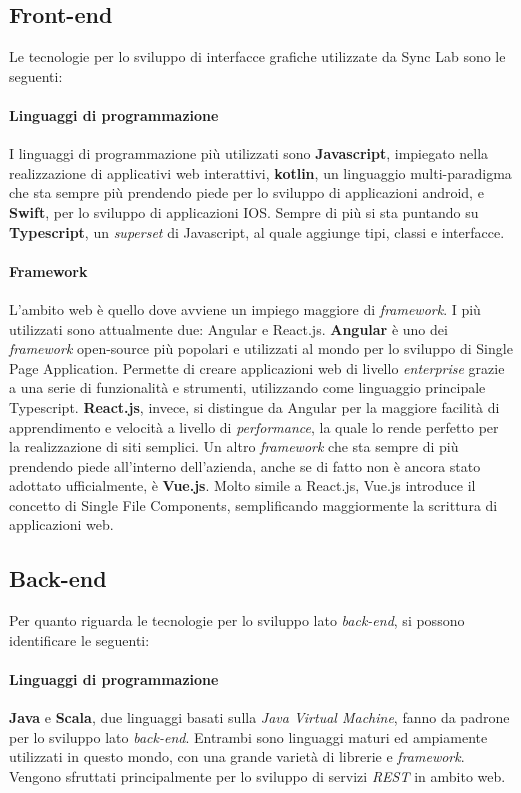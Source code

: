 \subsection{Front-end}
Le tecnologie per lo sviluppo di interfacce grafiche utilizzate da Sync Lab sono le seguenti:

\paragraph{Linguaggi di programmazione} 
I linguaggi di programmazione più utilizzati sono \textbf{Javascript}, impiegato nella realizzazione di applicativi web interattivi, \textbf{kotlin}, un linguaggio multi-paradigma che sta sempre più prendendo piede per lo sviluppo di applicazioni android, e \textbf{Swift}, per lo sviluppo di applicazioni IOS. Sempre di più si sta puntando su \textbf{Typescript}, un \textit{superset} di Javascript, al quale aggiunge tipi, classi e interfacce.

\paragraph{Framework}
L'ambito web è quello dove avviene un impiego maggiore di \textit{framework}. I più utilizzati sono attualmente due: Angular e React.js. \textbf{Angular} è uno dei \textit{framework} open-source più popolari e utilizzati al mondo per lo sviluppo di \gls{Single Page Application}. Permette di creare applicazioni web di livello \textit{enterprise} grazie a una serie di funzionalità e strumenti, utilizzando come linguaggio principale Typescript. \textbf{React.js}, invece, si distingue da Angular per la maggiore facilità di apprendimento e velocità a livello di \textit{performance}, la quale lo rende perfetto per la realizzazione di siti semplici. Un altro \textit{framework} che sta sempre di più prendendo piede all'interno dell'azienda, anche se di fatto non è ancora stato adottato ufficialmente, è \textbf{Vue.js}. Molto simile a React.js, Vue.js introduce il concetto di \gls{Single File Components}, semplificando maggiormente la scrittura di applicazioni web.

\subsection{Back-end}
Per quanto riguarda le tecnologie per lo sviluppo lato \textit{back-end}, si possono identificare le seguenti:

\paragraph{Linguaggi di programmazione}
\textbf{Java} e \textbf{Scala}, due linguaggi basati sulla \textit{Java Virtual Machine}, fanno da padrone per lo sviluppo lato \textit{back-end}. Entrambi sono linguaggi maturi ed ampiamente utilizzati in questo mondo, con una grande varietà di librerie e \textit{framework}. Vengono sfruttati principalmente per lo sviluppo di servizi \textit{REST} in ambito web.

